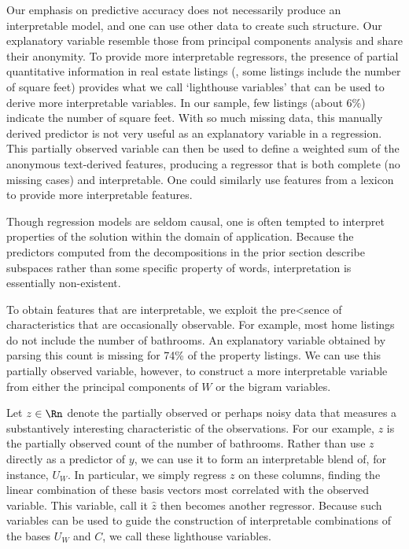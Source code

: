 \documentclass[12pt]{article}
\begin{document}
 Our emphasis on predictive accuracy does not necessarily produce an
 interpretable model, and one can use other data to create such structure.  Our
 explanatory variable resemble those from principal components analysis and
 share their anonymity.  To provide more interpretable regressors, the presence
 of partial quantitative information in real estate listings (\eg, some listings
 include the number of square feet) provides what we call ‘lighthouse variables’
 that can be used to derive more interpretable variables.  In our sample, few
 listings (about 6\%) indicate the number of square feet.  With so much missing
 data, this manually derived predictor is not very useful as an explanatory
 variable in a regression.  This partially observed variable can then be used to
 define a weighted sum of the anonymous text-derived features, producing a
 regressor that is both complete (no missing cases) and interpretable.  One
 could similarly use features from a lexicon to provide more interpretable
 features.


Though regression models are seldom causal, one is often tempted to interpret
 properties of the solution within the domain of application.  Because the
 predictors computed from the decompositions in the prior section describe
 subspaces rather than some specific property of words, interpretation is
 essentially non-existent.


 To obtain features that are interpretable, we exploit the pre<sence of
 characteristics that are occasionally observable.  For example,
 most home listings do not include the number of bathrooms.  An
 explanatory variable obtained by parsing this count is missing for 74\% of the property listings.  We can use this partially observed variable, however, to construct a more interpretable variable from either the principal components of $W$ or the bigram variables.  


 Let $z \in \Rn$ denote the partially observed or perhaps noisy data
 that measures a substantively interesting characteristic of the
 observations.  For our example, $z$ is the partially observed count of the number of bathrooms.  Rather than use $z$ directly as a predictor of $y$, we
 can use it to form an interpretable blend of, for instance, $U_W$.   In
 particular, we simply regress $z$ on these columns, finding the
 linear combination of these basis vectors most correlated with the
 observed variable.  This variable, call it $\hat{z}$ then becomes
 another regressor.  Because such variables can be used to guide the
 construction of interpretable combinations of the bases $U_W$ and
 $C$, we call these lighthouse variables.  
 
\end{document}
